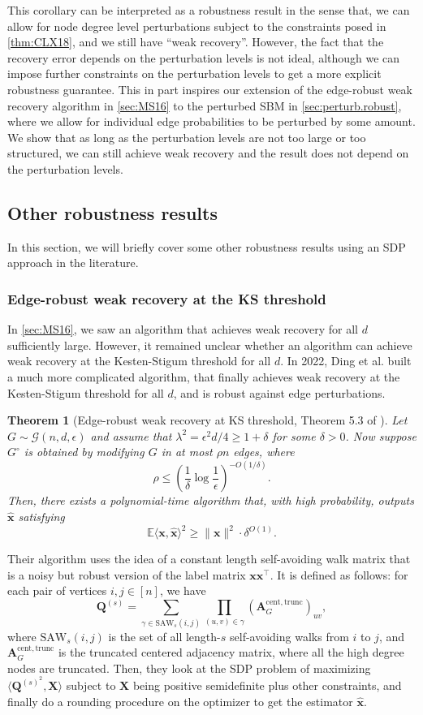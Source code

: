 \documentclass[11pt, titlepage]{article} %
\numberwithin{equation}{section}
\newtheorem{theorem}{Theorem}
\theoremstyle{definition}
\numberwithin{theorem}{section}
\numberwithin{lemma}{section}
\numberwithin{corollary}{section}
\numberwithin{proposition}{section}
\numberwithin{definition}{section}
\numberwithin{remark}{section}
\begin{document}
This corollary can be interpreted as a robustness result in the sense that, we can allow for node degree
level perturbations subject to the constraints posed in \cref{thm:CLX18}, and we still have
``weak recovery''. However, the fact that the recovery error depends on the perturbation levels
is not ideal, although we can impose further constraints on the perturbation levels to get a more
explicit robustness guarantee. This in part inspires our extension of the edge-robust weak recovery 
algorithm in \cref{sec:MS16} to the perturbed SBM in \cref{sec:perturb.robust}, where we allow
for individual edge probabilities to be perturbed by some amount. We show that as long as the
perturbation levels are not too large or too structured, we can still achieve weak recovery
and the result does not depend on the perturbation levels.

\subsection{Other robustness results}
In this section, we will briefly cover some other robustness results using an SDP approach in the literature.
\subsubsection{Edge-robust weak recovery at the KS threshold}
In \cref{sec:MS16}, we saw an algorithm that achieves weak recovery for all $d$ sufficiently large.
However, it remained unclear whether an algorithm can achieve weak recovery at the Kesten-Stigum 
threshold for all $d$. In 2022, Ding et al. \cite{DdNS22} built a much more complicated algorithm,
that finally achieves weak recovery at the Kesten-Stigum threshold for all $d$, and is robust 
against edge perturbations. 
\begin{theorem}[Edge-robust weak recovery at KS threshold, Theorem 5.3 of \cite{DdNS22}]
Let $G \sim \mathcal{G}(n, d, \epsilon)$ and assume that $\lambda^2 = \epsilon^2 d / 4 \geq 1 + \delta$ 
for some $\delta > 0$. Now suppose $G^\circ$ is obtained by modifying $G$ in at most $\rho n$ edges,
where
\[
\rho \leq \left(\frac{1}{\delta}\log\frac{1}{\epsilon}\right)^{-O(1/\delta)}.
\]
Then, there exists a polynomial-time algorithm that, with high probability, outputs $\hat{\bm{x}}$ 
satisfying
\[
\mathbb{E}\langle \bm{x}, \hat{\bm{x}} \rangle^2 \geq \|\bm{x}\|^2 \cdot \delta^{O(1)}.
\]
\end{theorem}
Their algorithm uses the idea of a constant length self-avoiding walk matrix that is a noisy but 
robust version of the label matrix $\bm{x}\bm{x}^\top$. It is defined as follows: for
each pair of vertices $i, j \in [n]$, we have
\[
\bm{Q}^{(s)} = \sum_{\gamma \in \mathrm{SAW}_s(i,j)} \prod_{(u,v) \in \gamma} 
(\bm{A}_G^\mathrm{cent,trunc})_{uv},
\]
where $\mathrm{SAW}_s(i,j)$ is the set of all length-$s$ self-avoiding walks from $i$ to $j$, and
$\bm{A}_G^\mathrm{cent,trunc}$ is the truncated centered adjacency matrix, where all the high degree
nodes are truncated. Then, they look at the SDP problem of maximizing $\langle \bm{Q}^{(s)^2}, \bm{X} \rangle$ 
subject to $\bm{X}$ being positive semidefinite plus other constraints, and finally do a rounding procedure
on the optimizer to get the estimator $\hat{\bm{x}}$.
\end{document}
